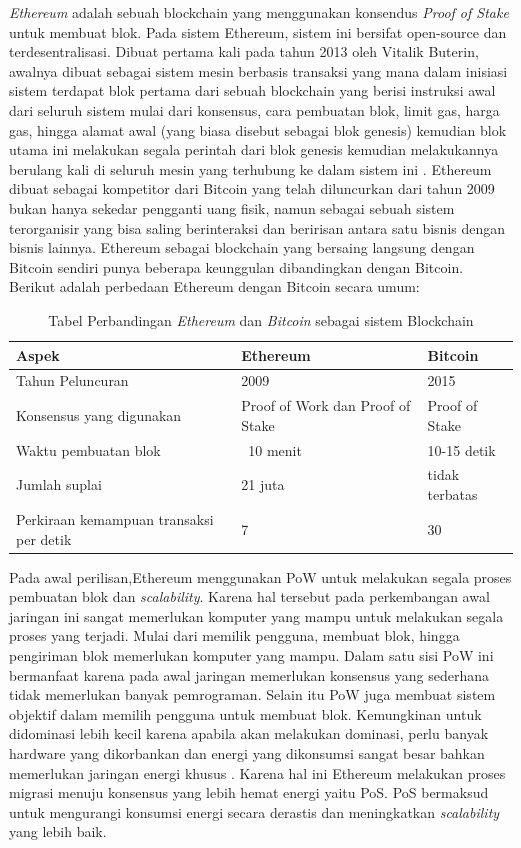 \emph{Ethereum} adalah sebuah blockchain yang menggunakan konsendus \emph{Proof of Stake} untuk membuat blok. Pada sistem Ethereum, sistem ini bersifat open-source dan terdesentralisasi. Dibuat pertama kali pada tahun 2013 oleh Vitalik Buterin, awalnya dibuat sebagai sistem mesin berbasis transaksi yang mana dalam inisiasi sistem terdapat blok pertama dari sebuah blockchain yang berisi instruksi awal dari seluruh sistem mulai dari konsensus, cara pembuatan blok, limit gas, harga gas, hingga alamat awal (yang biasa disebut sebagai blok genesis) kemudian blok utama ini melakukan segala perintah dari blok genesis kemudian melakukannya berulang kali di seluruh mesin yang terhubung ke dalam sistem ini \cite{MasteringEthGavinWood}. Ethereum dibuat sebagai kompetitor dari Bitcoin yang telah diluncurkan dari tahun 2009 bukan hanya sekedar pengganti uang fisik, namun sebagai sebuah sistem terorganisir yang bisa saling berinteraksi dan beririsan antara satu bisnis dengan bisnis lainnya. Ethereum sebagai blockchain yang bersaing langsung dengan Bitcoin sendiri punya beberapa keunggulan dibandingkan dengan Bitcoin. Berikut adalah perbedaan Ethereum dengan Bitcoin secara umum:

\begin{longtable}{|p{4cm}|p{5cm}|p{5cm}|}
  \caption{Tabel Perbandingan \emph{Ethereum} dan \emph{Bitcoin} sebagai sistem Blockchain}
  \label{tb:ethvsbitcoin}\\
  \hline
  \rowcolor[HTML]{C0C0C0}
  \textbf{Aspek} & \textbf{Ethereum} & \textbf{Bitcoin} \\
  \hline
Tahun Peluncuran & 2009 & 2015 \\
  \hline
Konsensus yang digunakan & Proof of Work dan Proof of Stake & Proof of Stake \\
  \hline
Waktu pembuatan blok & ~10 menit & 10-15 detik \\
  \hline
Jumlah suplai & 21 juta & tidak terbatas \\
  \hline
Perkiraan kemampuan transaksi per detik & 7 & 30 \\
 \hline
\end{longtable}

Pada awal perilisan,Ethereum menggunakan PoW untuk melakukan segala proses pembuatan blok dan \emph{scalability}. Karena hal tersebut pada perkembangan awal jaringan ini sangat memerlukan komputer yang mampu untuk melakukan segala proses yang terjadi. Mulai dari memilik pengguna, membuat blok, hingga pengiriman blok memerlukan komputer yang mampu. Dalam satu sisi PoW ini bermanfaat karena pada awal jaringan memerlukan konsensus yang sederhana tidak memerlukan banyak pemrograman. Selain itu PoW juga membuat sistem objektif dalam memilih pengguna untuk membuat blok. Kemungkinan untuk didominasi lebih kecil karena apabila akan melakukan dominasi, perlu banyak hardware yang dikorbankan dan energi yang dikonsumsi sangat besar bahkan memerlukan jaringan energi khusus \cite{poscons}. Karena hal ini Ethereum melakukan proses migrasi menuju konsensus yang lebih hemat energi yaitu PoS. PoS bermaksud untuk mengurangi konsumsi energi secara derastis dan meningkatkan \emph{scalability} yang lebih baik.

